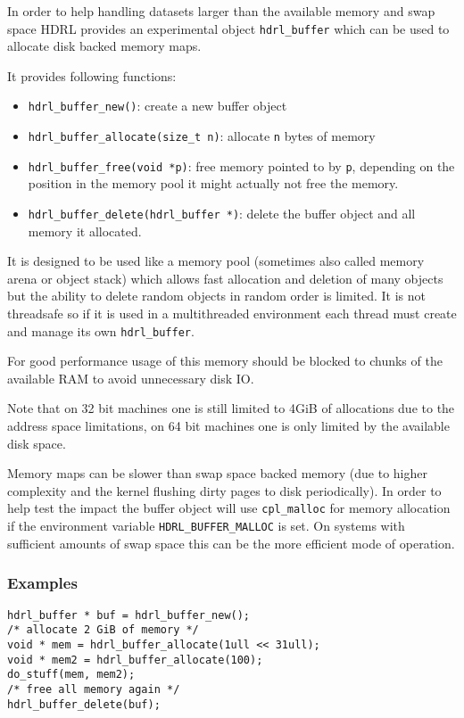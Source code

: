 In order to help handling datasets larger than the available memory and swap space
HDRL provides an experimental object \verb+hdrl_buffer+ which can be used to
allocate disk backed memory maps.

It provides following functions:
\begin{itemize}
\item \verb+hdrl_buffer_new()+: create a new buffer object
\item \verb+hdrl_buffer_allocate(size_t n)+: allocate \verb+n+ bytes of memory
\item \verb+hdrl_buffer_free(void *p)+: free memory pointed to by \verb+p+,
    depending on the position in the memory pool it might actually not free the
    memory.
\item \verb+hdrl_buffer_delete(hdrl_buffer *)+: delete the buffer object and all memory it
    allocated.
\end{itemize}

It is designed to be used like a memory pool (sometimes also called memory arena
or object stack) which allows fast allocation and deletion of many objects but
the ability to delete random objects in random order is limited.
It is not threadsafe so if it is used in a multithreaded environment each
thread must create and manage its own \verb+hdrl_buffer+.

For good performance usage of this memory should be blocked to chunks of the
available RAM to avoid unnecessary disk IO.

Note that on 32 bit machines one is still limited to 4GiB of allocations due to
the address space limitations, on 64 bit machines one is only limited by the
available disk space.

Memory maps can be slower than swap space backed memory (due to higher
complexity and the kernel flushing dirty pages to disk periodically).
In order to help test the impact the buffer object will use \verb+cpl_malloc+
for memory allocation if the environment variable \verb+HDRL_BUFFER_MALLOC+ is
set.
On systems with sufficient amounts of swap space this can be the more efficient
mode of operation.

\subsubsection{Examples}
\begin{lstlisting}
hdrl_buffer * buf = hdrl_buffer_new();
/* allocate 2 GiB of memory */
void * mem = hdrl_buffer_allocate(1ull << 31ull);
void * mem2 = hdrl_buffer_allocate(100);
do_stuff(mem, mem2);
/* free all memory again */
hdrl_buffer_delete(buf);
\end{lstlisting}

